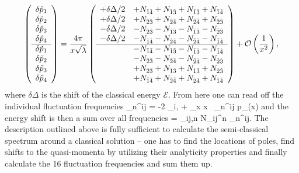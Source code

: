\begin{equation}
\left(
\begin{array}{c}
  \delta \hat{p}_1 \\
  \delta \hat{p}_2 \\
  \delta \hat{p}_3 \\
  \delta \hat{p}_4 \\
  \hline
  \delta \tilde{p}_1 \\
  \delta \tilde{p}_2 \\
  \delta \tilde{p}_3 \\
  \delta \tilde{p}_4 \\
\end{array}
\right) = \frac{4 \pi}{x \sqrt{\lambda}}
\left(
\begin{array}{rl}
  + \delta \Delta/2 &+ N_{\hat{1}\hat{4}} + N_{\hat{1}\hat{3}} + N_{\hat{1}\tilde{3}} + N_{\hat{1}\tilde{4}} \\
  + \delta \Delta/2 &+ N_{\hat{2}\hat{3}} + N_{\hat{2}\hat{4}} + N_{\hat{2}\tilde{4}} + N_{\hat{2}\tilde{3}} \\
  - \delta \Delta/2 &- N_{\hat{2}\hat{3}} - N_{\hat{1}\hat{3}} - N_{\tilde{1}\hat{3}} - N_{\tilde{2}\hat{3}} \\
  - \delta \Delta/2 &- N_{\hat{1}\hat{4}} - N_{\hat{2}\hat{4}} - N_{\tilde{2}\hat{4}} - N_{\tilde{1}\hat{4}} \\
  \hline
   &- N_{\tilde{1}\tilde{4}} - N_{\tilde{1}\tilde{3}} - N_{\tilde{1}\hat{3}} - N_{\tilde{1}\hat{4}} \\
   &- N_{\tilde{2}\tilde{3}} - N_{\tilde{2}\tilde{4}} - N_{\tilde{2}\hat{4}} - N_{\tilde{2}\hat{3}} \\
   &+ N_{\tilde{2}\tilde{3}} + N_{\tilde{1}\tilde{3}} + N_{\hat{1}\tilde{3}} + N_{\hat{2}\tilde{3}} \\
   &+ N_{\tilde{1}\tilde{4}} + N_{\tilde{2}\tilde{4}} + N_{\hat{2}\tilde{4}} + N_{\hat{1}\tilde{4}} \\
\end{array}
\right) + \mathcal{O}\left(\frac{1}{x^2}\right),
\label{eq:quasi_shift_asymptotics}
\end{equation}
where $\delta\Delta$ is the shift of the classical energy $\mathcal{E}$. From here one can read off the individual fluctuation frequencies
\beq
	\label{eq:quasi_energy}
	\Omega_n^{ij} = -2 \delta_{i,} + \frac{\lambda}{2\pi} \lim_{x\rightarrow \infty} x \, \delta_n^{ij} p_{}(x)
\eeq
and the energy shift is then a sum over all frequencies
\beq
	\delta \Delta = \sum_{ij,n} N_{ij}^n \Omega_n^{ij}.
\eeq
The description outlined above is fully sufficient to calculate the semi-classical spectrum around a classical solution -- one has to find the locations of poles, find shifts to the quasi-momenta by utilizing their analyticity properties and finally calculate the 16 fluctuation frequencies and sum them up. 
